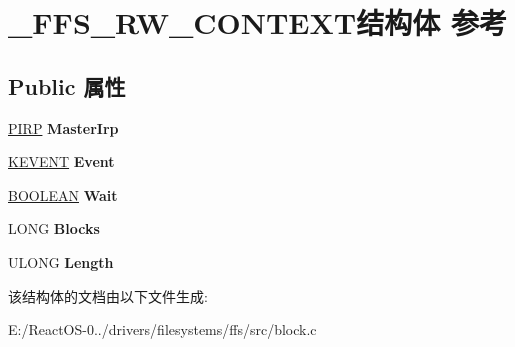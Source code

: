 \hypertarget{struct___f_f_s___r_w___c_o_n_t_e_x_t}{}\section{\+\_\+\+F\+F\+S\+\_\+\+R\+W\+\_\+\+C\+O\+N\+T\+E\+X\+T结构体 参考}
\label{struct___f_f_s___r_w___c_o_n_t_e_x_t}
\subsection*{Public 属性}
\begin{DoxyCompactItemize}
\item 
\mbox{\label{struct___f_f_s___r_w___c_o_n_t_e_x_t_ab3b0919bc53121d514372f904b1bb1b3}} 
\hyperlink{interfacevoid}{P\+I\+RP} {\bfseries Master\+Irp}
\item 
\mbox{\label{struct___f_f_s___r_w___c_o_n_t_e_x_t_ad633dcd1ced03be4b423e5c2f303b222}} 
\hyperlink{struct___k_e_v_e_n_t}{K\+E\+V\+E\+NT} {\bfseries Event}
\item 
\mbox{\label{struct___f_f_s___r_w___c_o_n_t_e_x_t_a47aba1dcb696f26f9ded9e599b4c9010}} 
\hyperlink{_processor_bind_8h_a112e3146cb38b6ee95e64d85842e380a}{B\+O\+O\+L\+E\+AN} {\bfseries Wait}
\item 
\mbox{\label{struct___f_f_s___r_w___c_o_n_t_e_x_t_a1b6f7bee3eda07e7da02837a26d3f0c9}} 
L\+O\+NG {\bfseries Blocks}
\item 
\mbox{\label{struct___f_f_s___r_w___c_o_n_t_e_x_t_a5f5ffb5c49a672b4b56294e2a9efef7b}} 
U\+L\+O\+NG {\bfseries Length}
\end{DoxyCompactItemize}


该结构体的文档由以下文件生成\+:\begin{DoxyCompactItemize}
\item 
E\+:/\+React\+O\+S-\/0../drivers/filesystems/ffs/src/block.\+c\end{DoxyCompactItemize}

